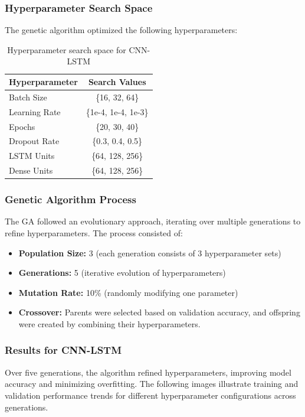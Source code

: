 \subsubsection{Hyperparameter Search Space}
The genetic algorithm optimized the following hyperparameters:

\begin{table}[h]
    \centering
    \begin{tabular}{|l|c|}
        \hline
        \textbf{Hyperparameter} & \textbf{Search Values} \\
        \hline
        Batch Size & \{16, 32, 64\} \\
        Learning Rate & \{1e-4, 1e-4, 1e-3\} \\
        Epochs & \{20, 30, 40\} \\
        Dropout Rate & \{0.3, 0.4, 0.5\} \\
        LSTM Units & \{64, 128, 256\} \\
        Dense Units & \{64, 128, 256\} \\
        \hline
    \end{tabular}
    \caption{Hyperparameter search space for CNN-LSTM}
    \label{tab:search_space}
\end{table}

\subsubsection{Genetic Algorithm Process}
The GA followed an evolutionary approach, iterating over multiple generations to refine hyperparameters. The process consisted of:

\begin{itemize}
    \item \textbf{Population Size:} 3 (each generation consists of 3 hyperparameter sets)
    \item \textbf{Generations:} 5 (iterative evolution of hyperparameters)
    \item \textbf{Mutation Rate:} 10\% (randomly modifying one parameter)
    \item \textbf{Crossover:} Parents were selected based on validation accuracy, and offspring were created by combining their hyperparameters.
\end{itemize}
\subsubsection{Results for CNN-LSTM}
Over five generations, the algorithm refined hyperparameters, improving model accuracy and minimizing overfitting. The following images illustrate training and validation performance trends for different hyperparameter configurations across generations.

